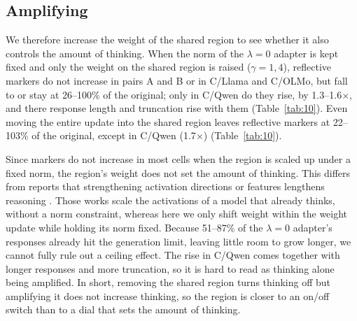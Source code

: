 \begin{table}[t]
\centering
\small

\caption{Reflective-marker frequency, share of completed responses, and accuracy when the grafted amount is raised to $\beta=2$. graft shared, graft other and graft whole are as in Table~\ref{tab:8}; frequencies are measured on the early part of each response, before repetition builds up. Thinking turns on only when the shared region is grafted, but those responses are not finished. Values after $\pm$ are standard deviations across three seeds.}
\label{tab:9}
\end{table}

\subsection{Amplifying}\label{sec:amplify}

We therefore increase the weight of the shared region to see whether it also controls the amount of thinking. When the norm of the $\lambda=0$ adapter is kept fixed and only the weight on the shared region is raised ($\gamma = 1, 4$), reflective markers do not increase in pairs A and B or in C/Llama and C/OLMo, but fall to or stay at 26--100\% of the original; only in C/Qwen do they rise, by 1.3--1.6$\times$, and there response length and truncation rise with them (Table~\ref{tab:10}). Even moving the entire update into the shared region leaves reflective markers at 22--103\% of the original, except in C/Qwen (1.7$\times$) (Table~\ref{tab:10}).

Since markers do not increase in most cells when the region is scaled up under a fixed norm, the region's weight does not set the amount of thinking. This differs from reports that strengthening activation directions or features lengthens reasoning \citep{sheng2025planning,jayabahu2026halt,galichin2026covered}. Those works scale the activations of a model that already thinks, without a norm constraint, whereas here we only shift weight within the weight update while holding its norm fixed. Because 51--87\% of the $\lambda=0$ adapter's responses already hit the generation limit, leaving little room to grow longer, we cannot fully rule out a ceiling effect. The rise in C/Qwen comes together with longer responses and more truncation, so it is hard to read as thinking alone being amplified. In short, removing the shared region turns thinking off but amplifying it does not increase thinking, so the region is closer to an on/off switch than to a dial that sets the amount of thinking.

